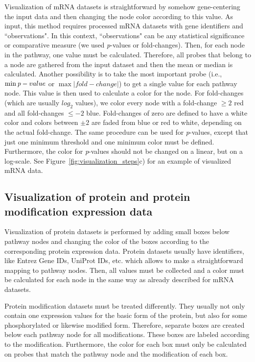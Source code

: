 \documentclass{bioinfo}
\begin{document}
Visualization of mRNA datasets is straightforward by somehow gene-centering the input data and then
changing the node color according to this value. As input, this method requires processed mRNA
datasets with gene identifiers and ``observations". In this context, ``observations" can be any
statistical significance or comparative measure (we used \emph{p}-values or fold-changes). Then, for
each node in the pathway, one value must be calculated. Therefore, all probes that belong to a node
are gathered from the input dataset and then the mean or median is calculated. Another possibility
is to take the most important probe (i.e., $\min\emph{p}-value$ or $\max|fold-change|$) to get a
single value for each pathway node.  This value is then used to calculate a color for the node. For
fold-changes (which are usually $log_2$ values), we color every node with a fold-change $\geq2$ red
and all fold-changes $\leq-2$ blue. Fold-changes of zero are defined to have a white color and
colors between $\pm2$ are faded from blue or red to white, depending on the actual fold-change. The
same procedure can be used for \emph{p}-values, except that just one minimum threshold and one
minimum color must be defined. Furthermore, the color for \emph{p}-values should not be changed on a
linear, but on a log-scale. See Figure~\ref{fig:visualization_steps}c) for an example of visualized
mRNA data.

\subsection{Visualization of protein and protein modification expression data}

Visualization of protein datasets is performed by adding small boxes below pathway nodes and
changing the color of the boxes according to the corresponding protein expression data. Protein
datasets usually have identifiers, like Entrez Gene IDs, UniProt IDs, etc. which allows to make a
straightforward mapping to pathway nodes. Then, all values must be collected and a color must be
calculated for each node in the same way as already described for mRNA datasets.

Protein modification datasets must be treated differently. They usually not only contain one
expression values for the basic form of the protein, but also for some phosphorylated or likewise
modified form. Therefore, separate boxes are created below each pathway node for all
modifications. These boxes are labeled according to the modification. Furthermore, the color for
each box must only be calculated on probes that match the pathway node and the modification of each
box.
\end{document}
